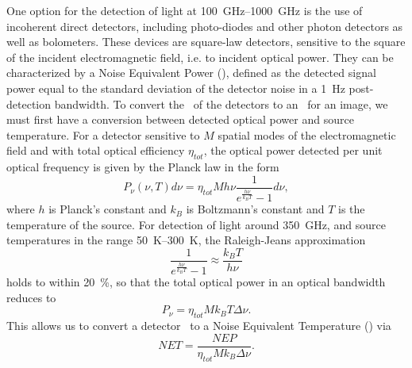 One option for the detection of light at \SIrange{100}{1000}{\GHz} is the use of incoherent direct detectors, including photo-diodes and other photon detectors as well as bolometers.
These devices are square-law detectors, sensitive to the square of the incident electromagnetic field, i.e. to incident optical power.
They can be characterized by a Noise Equivalent Power (\NEP), defined as the detected signal power equal to the standard deviation of the detector noise in a \SI{1}{\Hz} post-detection bandwidth.
To convert the \NEP\ of the detectors to an \NETD\ for an image, we must first have a conversion between detected optical power and source temperature.
For a detector sensitive to $M$ spatial modes of the electromagnetic field and with total optical efficiency $\eta_{tot}$, the optical power detected per unit optical frequency is given by the Planck law in the form \cite{richards_bolometers_1994}
\begin{equation} \label{eqn:ch1-planck}
  P_{\nu}(\nu,T) d \nu = \eta_{tot} M h \nu \frac{1}{e^{\frac{h \nu}{k_B T}} - 1} d \nu,
\end{equation}
where $h$ is Planck's constant and $k_B$ is Boltzmann's constant and $T$ is the temperature of the source.
For detection of light around \SI{350}{\GHz}, and source temperatures in the range \SIrange{50}{300}{\K}, the Raleigh-Jeans approximation
\begin{equation}
  \frac{1}{e^{\frac{h \nu}{k_B T}} - 1} \approx \frac{k_B T}{h \nu}
\end{equation}
holds to within \SI{20}{\percent}, so that the total optical power in an optical bandwidth reduces to 
\begin{equation}
  P_{\nu} = \eta_{tot} M k_B T \Delta \nu.
\end{equation}
This allows us to convert a detector \NEP\ to a Noise Equivalent Temperature (\NET) via
\begin{equation}
  NET = \frac{NEP}{\eta_{tot} M k_B \Delta \nu}.
\end{equation}

